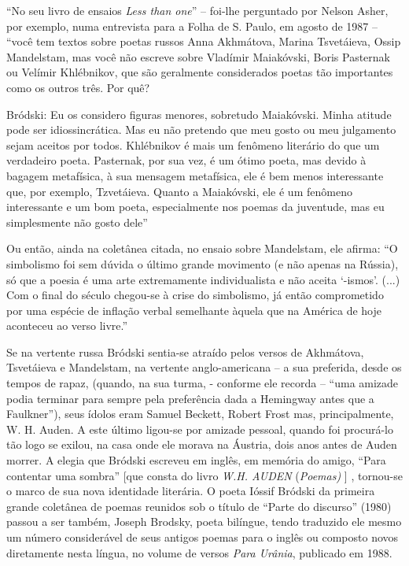 ``No seu livro de ensaios \emph{Less than one}'' -- foi-lhe perguntado
por Nelson Asher, por exemplo, numa entrevista para a Folha de S. Paulo,
em agosto de 1987 -- ``você tem textos sobre poetas russos Anna
Akhmátova, Marina Tsvetáieva, Ossip Mandelstam, mas você não escreve
sobre Vladímir Maiakóvski, Boris Pasternak ou Velímir Khlébnikov, que
são geralmente considerados poetas tão importantes como os outros três.
Por quê?

Bródski: Eu os considero figuras menores, sobretudo Maiakóvski. Minha
atitude pode ser idiossincrática. Mas eu não pretendo que meu gosto ou
meu julgamento sejam aceitos por todos. Khlébnikov é mais um fenômeno
literário do que um verdadeiro poeta. Pasternak, por sua vez, é um ótimo
poeta, mas devido à bagagem metafísica, à sua mensagem metafísica, ele é
bem menos interessante que, por exemplo, Tzvetáieva. Quanto a
Maiakóvski, ele é um fenômeno interessante e um bom poeta, especialmente
nos poemas da juventude, mas eu simplesmente não gosto dele''

Ou então, ainda na coletânea citada, no ensaio sobre Mandelstam, ele
afirma: ``O simbolismo foi sem dúvida o último grande movimento (e não
apenas na Rússia), só que a poesia é uma arte extremamente
individualista e não aceita `-ismos'. (...) Com o final do século
chegou-se à crise do simbolismo, já então comprometido por uma espécie
de inflação verbal semelhante àquela que na América de hoje aconteceu ao
verso livre.''

Se na vertente russa Bródski sentia-se atraído pelos versos de
Akhmátova, Tsvetáieva e Mandelstam, na vertente anglo-americana -- a sua
preferida, desde os tempos de rapaz, (quando, na sua turma, - conforme
ele recorda -- ``uma amizade podia terminar para sempre pela preferência
dada a Hemingway antes que a Faulkner''), seus ídolos eram Samuel
Beckett, Robert Frost mas, principalmente, W. H. Auden. A este último
ligou-se por amizade pessoal, quando foi procurá-lo tão logo se exilou,
na casa onde ele morava na Áustria, dois anos antes de Auden morrer. A
elegia que Bródski escreveu em inglês, em memória do amigo, ``Para
contentar uma sombra'' {[}que consta do livro \emph{W.H. AUDEN}
(\emph{Poemas)} {]} , tornou-se o marco de sua nova identidade
literária. O poeta Ióssif Bródski da primeira grande coletânea de poemas
reunidos sob o título de ``Parte do discurso'' (1980) passou a ser
também, Joseph Brodsky, poeta bilíngue, tendo traduzido ele mesmo um
número considerável de seus antigos poemas para o inglês ou composto
novos diretamente nesta língua, no volume de versos \emph{Para Urânia},
publicado em 1988.

